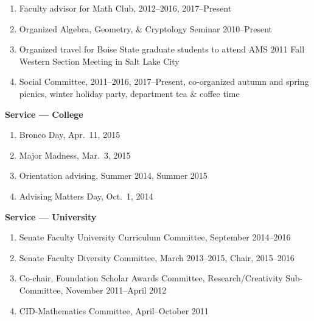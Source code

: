 \documentclass[12pt]{article}
\begin{document}
\begin{enumerate}
\item Faculty advisor for Math Club, 2012--2016, 2017--Present

\item Organized Algebra, Geometry, \& Cryptology Seminar 2010--Present

\item Organized travel for Boise State graduate students to attend AMS 2011 Fall Western Section Meeting in Salt Lake City

\item Social Committee, 2011--2016, 2017--Present, co-organized autumn and spring picnics, winter holiday party, department tea \& coffee time

\end{enumerate}

\textbf{Service --- College}
\begin{enumerate}
\item Bronco Day, Apr.\ 11, 2015
\item Major Madness, Mar.\ 3, 2015
\item Orientation advising, Summer 2014, Summer 2015
\item Advising Matters Day, Oct.\ 1, 2014
\end{enumerate}


\textbf{Service --- University}
\begin{enumerate}
\item Senate Faculty University Curriculum Committee, September 2014--2016

\item Senate Faculty Diversity Committee, March 2013--2015, Chair, 2015--2016

\item Co-chair, Foundation Scholar Awards Committee, Research/Creativity Sub-Committee, Nov\-ember 2011--April 2012

\item CID-Mathematics Committee, April--October 2011
\end{enumerate}
\end{document}
